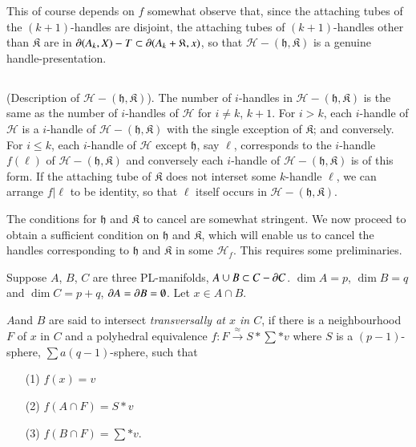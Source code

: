 This of course depends on $f$ somewhat observe that, since the attaching tubes of the $(k+1)$-handles are disjoint, the attaching tubes of $(k+1)$-handles other than $\mathfrak{K}$ are in $\partial(A_{k},X)-T\subset \partial (A_{k}+\mathfrak{K},x)$, so that $\mathscr{H}-(\mathfrak{h},\mathfrak{K})$ is a genuine handle-presentation.

\setcounter{subsection}{2}
\subsection{}\label{chap8-sec8.5.3}
(Description of $\mathscr{H}-(\mathfrak{h},\mathfrak{K})$). The number of $i$-handles in $\mathscr{H}-(\mathfrak{h},\mathfrak{K})$ is the same as the number of $i$-handles of $\mathscr{H}$ for $i\neq k$, $k+1$. For $i>k$, each $i$-handle of $\mathscr{H}$ is a $i$-handle of $\mathscr{H}-(\mathfrak{h},\mathfrak{K})$ with the single exception of $\mathfrak{K}$; and conversely. For $i\leq k$, each $i$-handle of $\mathscr{H}$ except $\mathfrak{h}$, say $\ell$, corresponds to the $i$-handle $f(\ell)$ of $\mathscr{H}-(\mathfrak{h},\mathfrak{K})$ and conversely each $i$-handle of $\mathscr{H}-(\mathfrak{h},\mathfrak{K})$ is of this form. If the attaching tube of $\mathfrak{K}$ does not interset some $k$-handle $\ell$, we can arrange $f|\ell$ to be identity, so that $\ell$ itself occurs in 
$\mathscr{H}-(\mathfrak{h},\mathfrak{K})$.

The conditions for $\mathfrak{h}$ and $\mathfrak{K}$ to cancel are somewhat stringent. We now proceed to obtain a sufficient condition on $\mathfrak{h}$ and $\mathfrak{K}$, which will enable us to cancel the handles corresponding to $\mathfrak{h}$ and $\mathfrak{K}$ in some $\mathscr{H}_{f}$. This requires some preliminaries.

Suppose $A$, $B$, $C$ are three PL-manifolds, $A\cup B\subset C-\partial C$. $\dim A=p$, $\dim B=q$ and $\dim C=p+q$, $\partial A=\partial B=\emptyset$. Let $x\in A\cap B$. 

\setcounter{proposition}{3}
\begin{definition}\label{chap8-defi8.5.4}
$A$\pageoriginale and $B$ are said to intersect {\em transversally at $x$ in $C$}, if there is a neighbourhood $F$ of $x$ in $C$ and a polyhedral equivalence $f:F\xrightarrow{\approx}S\ast \sum \ast v$ where $S$ is a $(p-1)$-sphere, $\sum a(q-1)$-sphere, such that
\begin{itemize}
\item[(1)] $f(x)=v$

\item[(2)] $f(A\cap F)=S\ast v$

\item[(3)] $f(B\cap F)=\sum \ast v$.
\end{itemize}
\end{definition}

